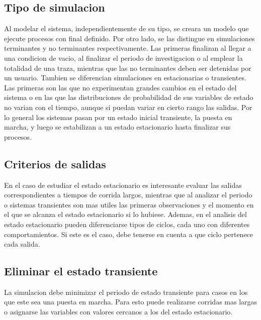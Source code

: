 \documentclass[a4paper]{article}
\begin{document}
\subsection*{Tipo de simulacion}
Al modelar el sistema, independientemente de su tipo, se creara un modelo que ejecute procesos con final definido.
Por otro lado, se las distingue en simulaciones terminantes y no terminantes respectivamente.
Las primeras finalizan al llegar a una condicion de vacio, al finalizar el periodo de investigacion o al 
emplear la totalidad de una traza, mientras que las no terminantes deben ser detenidas por un usuario.
Tambien se diferencian simulaciones en estacionarias o transientes. Las primeras son las que no experimentan 
grandes cambios en el estado del sistema o en las que las distribuciones de probabilidad de sus variables de 
estado no varian con el tiempo, aunque si puedan variar en cierto rango las salidas. Por lo general los sistemas
pasan por un estado inicial transiente, la puesta en marcha, y luego se estabilizan a un estado estacionario 
hasta finalizar sus procesos.

\subsection*{Criterios de salidas}
En el caso de estudiar el estado estacionario es interesante evaluar las salidas correspondientes a tiempos de corrida largos, 
mientras que al analizar el periodo o sistemas transientes son mas utiles las primeras observaciones y el momento en el que se 
alcanza el estado estacionario si lo hubiese.
Ademas, en el analisis del estado estacionario pueden diferenciarse tipos de ciclos, cada uno con diferentes comportamientos.
Si este es el caso, debe tenerse en cuenta a que ciclo pertenece cada salida.

\subsection*{Eliminar el estado transiente}
La simulacion debe minimizar el periodo de estado transiente para casos en los que este sea una puesta en marcha. Para esto puede 
realizarse corridas mas largas o asignarse las variables con valores cercanos a los del estado estacionario.
\end{document}
